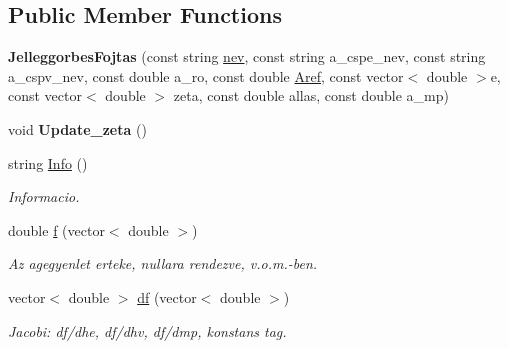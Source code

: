 \subsection*{Public Member Functions}
\begin{DoxyCompactItemize}
\item 
\hypertarget{class_jelleggorbes_fojtas_af66a653a2838a2a5a9669ecfd7dc6a0b}{}\label{class_jelleggorbes_fojtas_af66a653a2838a2a5a9669ecfd7dc6a0b} 
{\bfseries Jelleggorbes\+Fojtas} (const string \hyperlink{class_agelem_abe92b7e3912367d5d1caf6b277ca0b7d}{nev}, const string a\+\_\+cspe\+\_\+nev, const string a\+\_\+cspv\+\_\+nev, const double a\+\_\+ro, const double \hyperlink{class_agelem_a3f8668febc2958fd539997d537552f17}{Aref}, const vector$<$ double $>$e, const vector$<$ double $>$ zeta, const double allas, const double a\+\_\+mp)
\item 
\hypertarget{class_jelleggorbes_fojtas_a8ac49ed546134b5147796be94b22521a}{}\label{class_jelleggorbes_fojtas_a8ac49ed546134b5147796be94b22521a} 
void {\bfseries Update\+\_\+zeta} ()
\item 
\hypertarget{class_jelleggorbes_fojtas_a86d24b2271e234200a7ecbdccd4e94c1}{}\label{class_jelleggorbes_fojtas_a86d24b2271e234200a7ecbdccd4e94c1} 
string \hyperlink{class_jelleggorbes_fojtas_a86d24b2271e234200a7ecbdccd4e94c1}{Info} ()
\begin{DoxyCompactList}\small\item\em Informacio. \end{DoxyCompactList}\item 
\hypertarget{class_jelleggorbes_fojtas_a86bd9df0aa43f56c29dd451c92368724}{}\label{class_jelleggorbes_fojtas_a86bd9df0aa43f56c29dd451c92368724} 
double \hyperlink{class_jelleggorbes_fojtas_a86bd9df0aa43f56c29dd451c92368724}{f} (vector$<$ double $>$)
\begin{DoxyCompactList}\small\item\em Az agegyenlet erteke, nullara rendezve, v.\+o.\+m.-\/ben. \end{DoxyCompactList}\item 
\hypertarget{class_jelleggorbes_fojtas_a4962bb9e88d9f4c6453f1e57ae3c2041}{}\label{class_jelleggorbes_fojtas_a4962bb9e88d9f4c6453f1e57ae3c2041} 
vector$<$ double $>$ \hyperlink{class_jelleggorbes_fojtas_a4962bb9e88d9f4c6453f1e57ae3c2041}{df} (vector$<$ double $>$)
\begin{DoxyCompactList}\small\item\em Jacobi\+: df/dhe, df/dhv, df/dmp, konstans tag. \end{DoxyCompactList}\item 

\end{DoxyCompactItemize}
